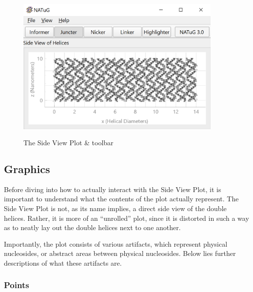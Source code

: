 \documentclass[titlepage]{article}
\begin{document}
	\begin{figure}[h]
		\centering
		\caption{The Side View Plot \& toolbar}
		\includegraphics[width=4in]{short-side-view-overview.png}
		\label{fig:short-side-view-overview}
	\end{figure}

	\subsection{Graphics}
	Before diving into how to actually interact with the Side View Plot, it is important to understand what the contents of the plot actually represent. The Side View Plot is not, as its name implies, a direct side view of the double helices. Rather, it is more of an “unrolled” plot, since it is distorted in such a way as to neatly lay out the double helices next to one another.
	
	Importantly, the plot consists of various artifacts, which represent physical nucleosides, or abstract areas between physical nucleosides. Below lies further descriptions of what these artifacts are.
	
	\subsubsection{Points}
	
\end{document}
